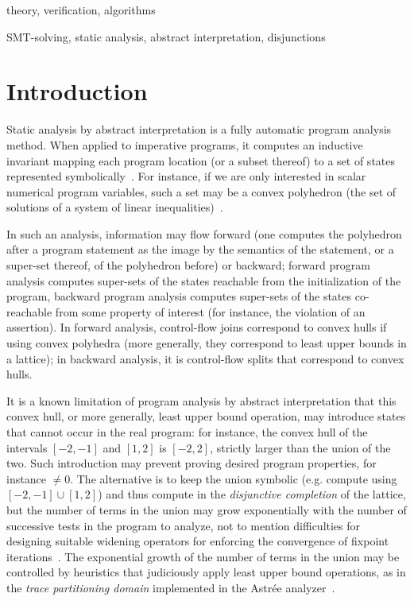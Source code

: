 \documentclass[preprint]{sigplanconf}
\begin{document}
\terms
theory, verification, algorithms

\keywords
SMT-solving, static analysis, abstract interpretation, disjunctions

\section{Introduction}
Static analysis by abstract interpretation is a fully automatic program analysis method. When applied to imperative programs, it computes an inductive invariant mapping each program location (or a subset thereof) to a set of states represented symbolically~\cite{CousotCousot_JLC92}.
For instance, if we are only interested in scalar numerical program variables, such a set may be a convex polyhedron (the set of solutions of a system of linear inequalities)~\cite{CousotHalbwachs78,Halbwachs_PhD,PPL,BagnaraHZ08SCP}.

In such an analysis, information may flow forward (one computes the polyhedron after a program statement as the image by the semantics of the statement, or a super-set thereof, of the polyhedron before) or backward;
forward program analysis computes super-sets of the states reachable from the initialization of the program, backward program analysis computes super-sets of the states co-reachable from some property of interest (for instance, the violation of an assertion).
In forward analysis, control-flow joins correspond to convex hulls if using convex polyhedra (more generally, they correspond to least upper bounds in a lattice); in backward analysis, it is control-flow splits that correspond to convex hulls.

It is a known limitation of program analysis by abstract interpretation that this convex hull, or more generally, least upper bound operation, may introduce states that cannot occur in the real program: for instance, the convex hull of the intervals $[-2,-1]$ and $[1,2]$ is $[-2,2]$, strictly larger than the union of the two.
Such introduction may prevent proving desired program properties, for instance $\neq 0$. The alternative is to keep the union symbolic (e.g. compute using $[-2,-1] \cup [1,2]$) and thus compute in the \emph{disjunctive completion}
of the lattice, but the number of terms in the union may grow exponentially with the number of successive tests in the program to analyze, not to mention difficulties for designing suitable widening operators for enforcing the convergence of fixpoint iterations~\cite{PPL,BagnaraHZ08SCP,DBLP:journals/sttt/BagnaraHZ07}.
The exponential growth of the number of terms in the union may be controlled by heuristics that judiciously apply least upper bound operations, as in the \emph{trace partitioning domain} \cite{Rival_Mauborgne_TOPLAS07} implemented in the Astr\'ee analyzer~\cite{ASTREE_PLDI03,ASTREE_ESOP05}.
\end{document}
